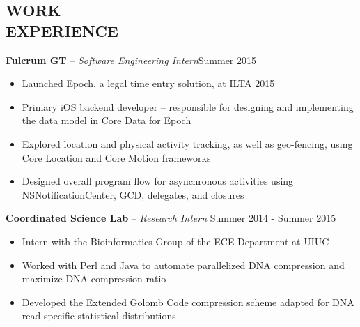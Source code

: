 \documentclass[resmargin]{res}
\begin{document}
\begin{resume}
\vspace{-3mm}
\section{WORK \\ EXPERIENCE} 
{\bf Fulcrum GT} -- {\sl Software Engineering Intern}\hfill Summer 2015
	\begin{itemize} \itemsep -2pt
	\item Launched Epoch, a legal time entry solution, at ILTA 2015
	\item Primary iOS backend developer -- responsible for designing and implementing the data model in Core Data for Epoch
	\item Explored location and physical activity tracking, as well as geo-fencing, using Core Location and Core Motion frameworks
	\item Designed overall program flow for asynchronous activities using NSNotificationCenter, GCD, delegates, and closures
	\end{itemize}
\vspace{-4mm}
{\bf Coordinated Science Lab} -- {\sl Research Intern }\hfill Summer 2014 - Summer 2015
                 \begin{itemize}  \itemsep -2pt %
                 \item Intern with the Bioinformatics Group of the ECE Department at UIUC 
                 \item Worked with Perl and Java to automate parallelized DNA 
                 {\mbox compression} and maximize DNA compression ratio
                 \item Developed the Extended Golomb Code compression scheme adapted for DNA read-specific statistical distributions
                \end{itemize}
 
\vspace{-4mm}

\end{resume}
\end{document}
